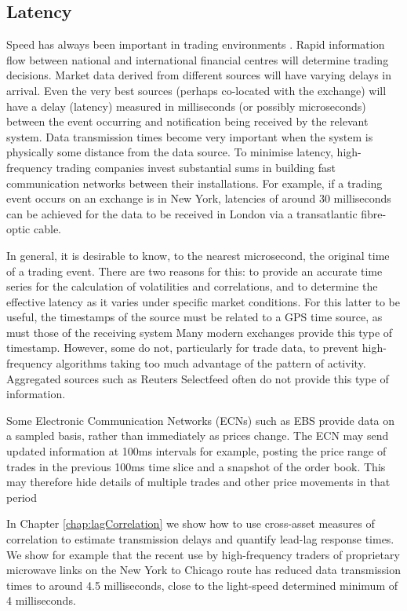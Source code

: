 \subsection{Latency}
Speed has always been important in trading environments . Rapid information flow between national and international financial centres will determine trading decisions.  Market data derived from different sources will have varying delays in arrival.  Even the very best sources (perhaps co-located with the exchange) will have a delay (latency) measured in milliseconds (or possibly microseconds) between the event occurring and notification being received by the relevant system. Data transmission times become very important when the system is physically some distance from the data source.  To minimise latency, high-frequency trading companies invest substantial sums in building fast communication networks between their installations. For example, if a trading event occurs on an exchange is in New York, latencies of around 30 milliseconds can be achieved for the data to be received in London via a transatlantic fibre-optic cable.  

In general, it is desirable to know, to the nearest microsecond, the original time of a trading event.  There are two reasons for this:  to provide an accurate time series for the calculation of volatilities and correlations, and to determine the effective latency as it varies under specific market conditions.  For this latter to be useful, the timestamps of the source must be related to a GPS time source, as must those of the receiving system   Many modern exchanges provide this type of timestamp.  However, some do not, particularly for trade data, to prevent high-frequency algorithms taking too much advantage of the pattern of activity.  Aggregated sources such as Reuters Selectfeed often do not provide this type of information.

Some Electronic Communication Networks (ECNs) such as EBS provide data on a sampled basis, rather than immediately as prices change.  The ECN may send updated information at 100ms intervals for example, posting the price range of trades in the previous 100ms time slice and a snapshot of the order book.  This may therefore hide details of multiple trades and other price movements in that period 

In Chapter \ref{chap:lagCorrelation} we show how to use cross-asset measures of correlation to estimate transmission delays and quantify lead-lag response times. We show for example that the recent use by high-frequency traders of proprietary microwave links on the New York to Chicago route has reduced data transmission times to around 4.5 milliseconds, close to the light-speed determined minimum of 4 milliseconds.


